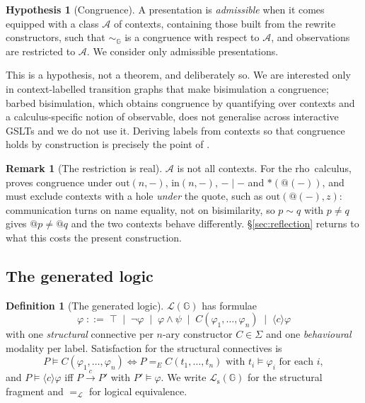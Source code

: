 \documentclass[11pt]{article}
\theoremstyle{plain}
\theoremstyle{definition}
\newtheorem{definition}[theorem]{Definition}
\newtheorem{remark}[theorem]{Remark}
\newtheorem{hypothesis}[theorem]{Hypothesis}
\newcommand{\rhoc}{\textsf{rho}}
\newcommand{\Gg}{\mathbb{G}}
\newcommand{\Lo}{\mathcal{L}}
\newcommand{\bis}{\sim}
\begin{document}
\begin{hypothesis}[Congruence]
\label{hyp:cong}
A presentation is \emph{admissible} when it comes equipped with a class $\mathcal{A}$ of contexts,
containing those built from the rewrite constructors, such that $\bis_\Gg$ is a congruence with respect
to $\mathcal{A}$, and observations are restricted to $\mathcal{A}$. We consider only admissible
presentations.
\end{hypothesis}

This is a hypothesis, not a theorem, and deliberately so. We are interested only in context-labelled
transition graphs that make bisimulation a congruence; barbed bisimulation, which obtains congruence by
quantifying over contexts and a calculus-specific notion of observable, does not generalise across
interactive GSLTs and we do not use it. Deriving labels from contexts so that congruence holds by
construction is precisely the point of \cite{LeiferMilner}.

\begin{remark}[The restriction is real]
\label{rem:areal}
$\mathcal{A}$ is not all contexts. For the \rhoc\ calculus, \cite{BIHOL} proves congruence under
$\mathrm{out}(n,-)$, $\mathrm{in}(n,-)$, $-\mid-$ and $\ast(@(-))$, and must exclude contexts with a
hole \emph{under} the quote, such as $\mathrm{out}(@(-),z)$: communication turns on name equality, not
on bisimilarity, so $p \bis q$ with $p \neq q$ gives $@p \neq @q$ and the two contexts behave
differently. \S\ref{sec:reflection} returns to what this costs the present construction.
\end{remark}

\subsection{The generated logic}

\begin{definition}[The generated logic]
$\Lo(\Gg)$ has formulae
\[
\varphi \;::=\; \top \;\mid\; \neg\varphi \;\mid\; \varphi \wedge \psi
\;\mid\; C(\varphi_1,\dots,\varphi_n) \;\mid\; \langle c \rangle \varphi
\]
with one \emph{structural} connective per $n$-ary constructor $C \in \Sigma$ and one \emph{behavioural}
modality per label. Satisfaction for the structural connectives is
\[
P \models C(\varphi_1,\dots,\varphi_n)
\iff
P =_E C(t_1,\dots,t_n) \text{ with } t_i \models \varphi_i \text{ for each } i,
\]
and $P \models \langle c\rangle\varphi$ iff $P \xrightarrow{c} P'$ with $P' \models \varphi$. We write
$\Lo_{\mathrm{s}}(\Gg)$ for the structural fragment and $=_{\Lo}$ for logical equivalence.
\end{definition}
\end{document}
